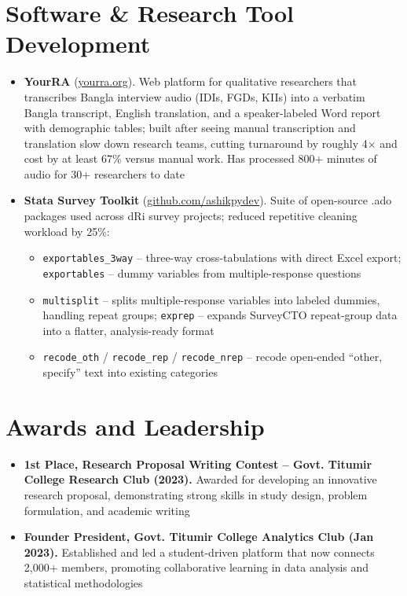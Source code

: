 \documentclass[11pt]{article}
\begin{document}
\section*{Software \& Research Tool Development}
\begin{itemize}
  \item \textbf{YourRA} (\href{https://yourra.org}{yourra.org}). Web platform for qualitative researchers that transcribes Bangla interview audio (IDIs, FGDs, KIIs) into a verbatim Bangla transcript, English translation, and a speaker-labeled Word report with demographic tables; built after seeing manual transcription and translation slow down research teams, cutting turnaround by roughly 4$\times$ and cost by at least 67\% versus manual work. Has processed 800+ minutes of audio for 30+ researchers to date
  \item \textbf{Stata Survey Toolkit} (\href{https://github.com/ashikpydev}{github.com/ashikpydev}). Suite of open-source .ado packages used across dRi survey projects; reduced repetitive cleaning workload by 25\%:
  \begin{itemize}[itemsep=1pt, topsep=2pt, parsep=0pt]
    \item \texttt{exportables\_3way} -- three-way cross-tabulations with direct Excel export; \texttt{exportables} -- dummy variables from multiple-response questions
    \item \texttt{multisplit} -- splits multiple-response variables into labeled dummies, handling repeat groups; \texttt{exprep} -- expands SurveyCTO repeat-group data into a flatter, analysis-ready format
    \item \texttt{recode\_oth} / \texttt{recode\_rep} / \texttt{recode\_nrep} -- recode open-ended ``other, specify'' text into existing categories
  \end{itemize}
\end{itemize}

\section*{Awards and Leadership}
\begin{itemize}
  \item \textbf{1st Place, Research Proposal Writing Contest -- Govt. Titumir College Research Club (2023).} Awarded for developing an innovative research proposal, demonstrating strong skills in study design, problem formulation, and academic writing
  \item \textbf{Founder President, Govt. Titumir College Analytics Club (Jan 2023).} Established and led a student-driven platform that now connects 2,000+ members, promoting collaborative learning in data analysis and statistical methodologies
\end{itemize}
\end{document}
